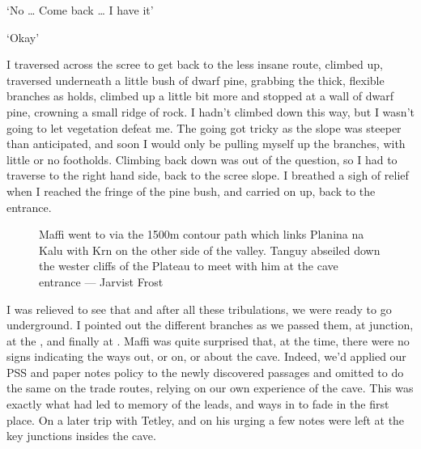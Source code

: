 ‘No … Come back … I have it’

‘Okay’

I traversed across the scree to get back to the less insane route, climbed up, traversed underneath a little bush of dwarf pine, grabbing the thick, flexible branches as holds, climbed up a little bit more and stopped at a wall of dwarf pine, crowning a small ridge of rock. I hadn’t climbed down this way, but I wasn’t going to let vegetation defeat me. The going got tricky as the slope was steeper than anticipated, and soon I would only be pulling myself up the branches, with little or no footholds. Climbing back down was out of the question, so I had to traverse to the right  hand side, back to the scree slope. I breathed a sigh of relief when I reached the fringe of the pine bush, and carried on up, back to the entrance. 

\begin{figure}[t!]
\checkoddpage \ifoddpage \forcerectofloat \else \forceversofloat \fi
\centering
{}
\caption{Maffi went to  via the 1500m contour path which links Planina na Kalu with Krn on the other side of the valley. Tanguy abseiled down the wester cliffs of the Plateau to meet with him at the cave entrance --- Jarvist Frost}
\label{forest}
\end{figure}

I was relieved to see that  and after all these tribulations, we were ready to go underground. I pointed out the different branches as we passed them, at  junction, at the , and finally at . Maffi was quite surprised that, at the time, there were no signs indicating the ways out, or on, or about the cave. Indeed, we’d applied our PSS and paper notes policy to the newly discovered passages and omitted to do the same on the trade routes, relying on our own experience of the cave. This was exactly what had led to memory of the leads, and ways in  to fade in the first place. On a later trip with Tetley, and on his urging a few notes were left at the key junctions insides the cave.

